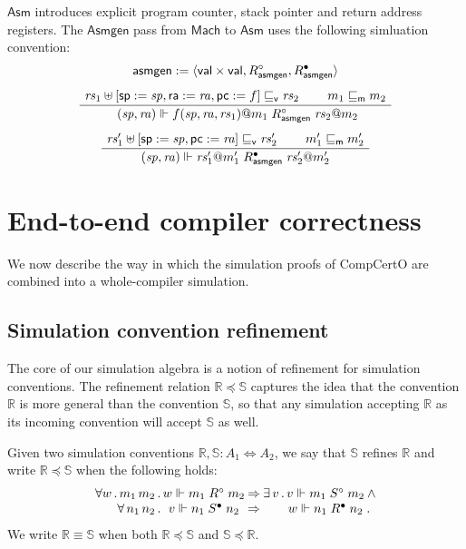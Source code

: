 \documentclass[sigplan,10pt,review,anonymous]{acmart}
\newcommand{\kw}[1]{\ensuremath{ \mathsf{#1} }}
\newcommand{\que}{\circ}
\newcommand{\ans}{\bullet}
\newcommand{\vref}{\sqsubseteq_\kw{v}}
\newcommand{\mext}{\sqsubseteq_\kw{m}}
\newcommand{\scref}{\preceq}
\begin{document}
\kw{Asm} introduces explicit
program counter, stack pointer and return address registers.
The \kw{Asmgen} pass from \kw{Mach} to \kw{Asm}
uses the following simluation convention:
\begin{gather*}
  \kw{asmgen} := \langle \kw{val} \times \kw{val},
    R_\kw{asmgen}^\que, R_\kw{asmgen}^\ans \rangle
  \\[1ex]
  \AxiomC{$\mathit{rs}_1 \uplus
    [\kw{sp} := \mathit{sp}, \kw{ra} := \mathit{ra}, \kw{pc} := f]
    \vref \mathit{rs}_2$}
  \AxiomC{$m_1 \mext m_2$}
  \BinaryInfC{
    $(\mathit{sp}, \mathit{ra}) \Vdash
     f(\mathit{sp}, \mathit{ra}, \mathit{rs}_1)@m_1
     \mathrel{R_\kw{asmgen}^\que}
     \mathit{rs}_2@m_2$}
  \DisplayProof
  \\[1ex]
  \AxiomC{$
    \mathit{rs}_1' \uplus [\kw{sp} := \mathit{sp}, \kw{pc} := \mathit{ra}]
    \vref \mathit{rs}_2'$}
  \AxiomC{$m_1' \mext m_2'$}
  \BinaryInfC{$
    (\mathit{sp}, \mathit{ra}) \Vdash \mathit{rs}_1'@m_1'
    \mathrel{R_\kw{asmgen}^\ans}
    \mathit{rs}_2'@m_2'$}
  \DisplayProof
\end{gather*}



\section{End-to-end compiler correctness} \label{sec:simalg} %

We now describe the way in which
the simulation proofs of CompCertO
are combined into
a whole-compiler simulation.

\subsection{Simulation convention refinement} %

The core of our simulation algebra is
a notion of refinement for simulation conventions.
The refinement relation $\mathbb{R} \scref \mathbb{S}$
captures the idea that the convention $\mathbb{R}$
is more general than the convention $\mathbb{S}$,
so that any simulation accepting $\mathbb{R}$ as its
incoming convention will accept $\mathbb{S}$ as well.

\begin{definition} %
Given two simulation conventions
$\mathbb{R}, \mathbb{S} : A_1 \Leftrightarrow A_2$,
we say that
$\mathbb{S}$ refines $\mathbb{R}$ and write
$\mathbb{R} \scref \mathbb{S}$
when the following holds:
\[
    \begin{array}{r@{}c@{\:\Rightarrow\:}c@{}c@{}l}
      \forall w \,.\, m_1 \, m_2 \,.\, &
      w \Vdash m_1 \mathrel{R^\que} m_2 &
      \exists \, v \,.\, &
      v \Vdash m_1 \mathrel{S^\que} m_2 &
      \: \wedge \\
      \forall \, n_1 \, n_2 \,.\, &
      v \Vdash n_1 \mathrel{S^\ans} n_2 &
      &
      w \Vdash n_1 \mathrel{R^\ans} n_2 & \,.
    \end{array}
\]
We write $\mathbb{R} \equiv \mathbb{S}$ when both
$\mathbb{R} \scref \mathbb{S}$ and
$\mathbb{S} \scref \mathbb{R}$.
\end{definition}
\end{document}
